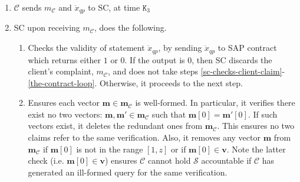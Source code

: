 \begin{enumerate}
\begin{enumerate}
\item $\mathcal C$  sends $m_{\scriptscriptstyle\mathcal C}$ and $\ddot{x}_{\scriptscriptstyle qp}$ to SC, at time $\texttt{K}_{\scriptscriptstyle 3}$



\item SC upon receiving $m_{\scriptscriptstyle\mathcal C}$, does the following. 
\begin{enumerate}
\item Checks the validity of  statement $\ddot{x}_{\scriptscriptstyle qp}$, by   sending $\ddot{x}_{\scriptscriptstyle qp}$ to SAP contract which  returns  either $1$ or $0$. If the output is $0$, then SC discards the client's complaint, ${m}_{\scriptscriptstyle\mathcal C}$, and does not take steps \ref{sc-checks-client-claim}-\ref{the-contract-loop}. Otherwise, it proceeds to the next step. 

 \item\label{sc-checks-client-claim} Ensures each vector   $ {\bm{m}}\in  {\bm{m}}_{\scriptscriptstyle\mathcal{C}}$ is well-formed. In particular, it verifies there exist no two vectors: $ {\bm{m}}, {\bm{m}}'\in  {\bm{m}}_{\scriptscriptstyle\mathcal{C}}$ such that $ {\bm{m}}[0]= {\bm{m}}'[0]$.  If such vectors  exist, it deletes the redundant ones from $ {\bm{m}}_{\scriptscriptstyle\mathcal{C}}$. This ensures no two claims refer to the same verification.  Also, it removes any vector $ {\bm{m}}$ from $ {\bm{m}}_{\scriptscriptstyle\mathcal{C}}$ if $ {\bm{m}}[0]$ is not in the range $[1,z]$ or if $ {\bm{m}}[0]\in  {\bm{v}}$. Note the latter check  (i.e. $ {\bm{m}}[0]\in  {\bm{v}}$) ensures $\mathcal C$ cannot hold $\mathcal S$ accountable if $\mathcal C$ has generated an ill-formed query for the same verification.   


\end{enumerate}
\end{enumerate}
\end{enumerate}
